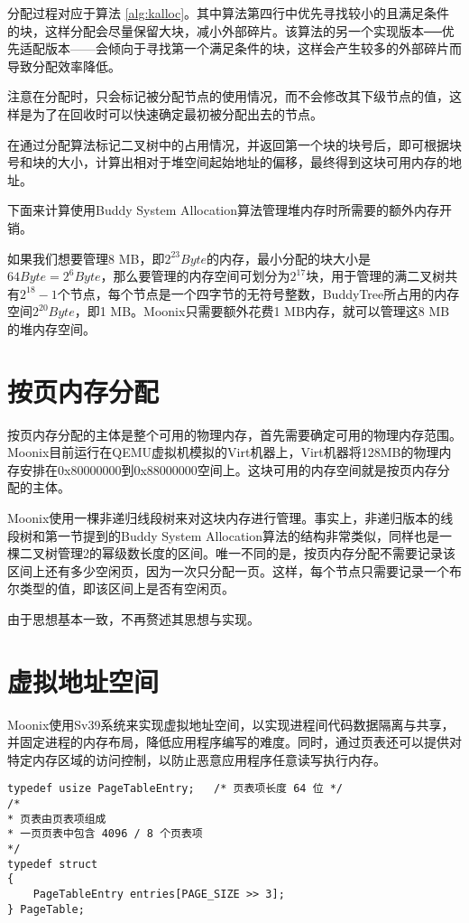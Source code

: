 \vspace{12 pt}

分配过程对应于算法 \ref{alg:kalloc}。其中算法第四行中优先寻找较小的且满足条件的块，这样分配会尽量保留大块，减小外部碎片。该算法的另一个实现版本──优先适配版本——会倾向于寻找第一个满足条件的块，这样会产生较多的外部碎片而导致分配效率降低。

注意在分配时，只会标记被分配节点的使用情况，而不会修改其下级节点的值，这样是为了在回收时可以快速确定最初被分配出去的节点。

在通过分配算法标记二叉树中的占用情况，并返回第一个块的块号后，即可根据块号和块的大小，计算出相对于堆空间起始地址的偏移，最终得到这块可用内存的地址。

下面来计算使用Buddy System Allocation算法管理堆内存时所需要的额外内存开销。

如果我们想要管理8 MB，即$2^{23} Byte$的内存，最小分配的块大小是$64 Byte = 2^6 Byte$，那么要管理的内存空间可划分为$2^{17}$块，用于管理的满二叉树共有$2^{18} - 1$个节点，每个节点是一个四字节的无符号整数，BuddyTree所占用的内存空间$2^{20} Byte$，即1 MB。Moonix只需要额外花费1 MB内存，就可以管理这8 MB的堆内存空间。

\section{按页内存分配}

按页内存分配的主体是整个可用的物理内存，首先需要确定可用的物理内存范围。Moonix目前运行在QEMU虚拟机模拟的Virt机器上，Virt机器将128MB的物理内存安排在0x80000000到0x88000000空间上。这块可用的内存空间就是按页内存分配的主体。

Moonix使用一棵非递归线段树来对这块内存进行管理。事实上，非递归版本的线段树和第一节提到的Buddy System Allocation算法的结构非常类似，同样也是一棵二叉树管理2的幂级数长度的区间。唯一不同的是，按页内存分配不需要记录该区间上还有多少空闲页，因为一次只分配一页。这样，每个节点只需要记录一个布尔类型的值，即该区间上是否有空闲页。

由于思想基本一致，不再赘述其思想与实现。

\section{虚拟地址空间}

Moonix使用Sv39系统来实现虚拟地址空间，以实现进程间代码数据隔离与共享，并固定进程的内存布局，降低应用程序编写的难度。同时，通过页表还可以提供对特定内存区域的访问控制，以防止恶意应用程序任意读写执行内存。

\begin{minipage}[c]{0.95\textwidth}
\begin{lstlisting}[language={moonix}, caption={页表相关数据结构定义}, label={lst:pagetable}]
typedef usize PageTableEntry;   /* 页表项长度 64 位 */
/*
* 页表由页表项组成 
* 一页页表中包含 4096 / 8 个页表项
*/
typedef struct
{
	PageTableEntry entries[PAGE_SIZE >> 3];
} PageTable;
\end{lstlisting}
\end{minipage}

